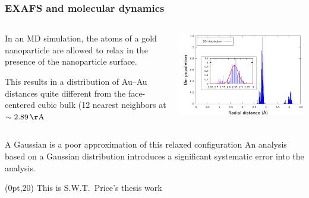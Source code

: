 \documentclass[10pt, xcolor=x11names, compress, handout]{beamer}
\begin{document}
\begin{frame}
  \frametitle{EXAFS and molecular dynamics}
  
  \begin{columns}
    \begin{column}{0.5\linewidth}
      In an MD simulation, the atoms of a gold nanoparticle are
      allowed to relax in the presence of the nanoparticle surface. 

      \medskip

      This results in a distribution of Au--Au distances quite
      different from the face-centered cubic bulk (12 nearest
      neighbors at $\sim2.89\,\mathrm{\AA}$
    \end{column}
    \begin{column}{0.5\linewidth}
      \includegraphics[width=\linewidth]{JM/histogram.png}
    \end{column}
  \end{columns}

  \begin{alertblock}{A Gaussian is a poor approximation of this
      relaxed configuration}
    An analysis based on a Gaussian distribution introduces a
    significant systematic error into the analysis.
  \end{alertblock}
  \begin{textblock*}{0.6\linewidth}(0pt,20\TPVertModule)
    \tiny This is S.W.T.\ Price's thesis work
  \end{textblock*}
\end{frame}
\end{document}
